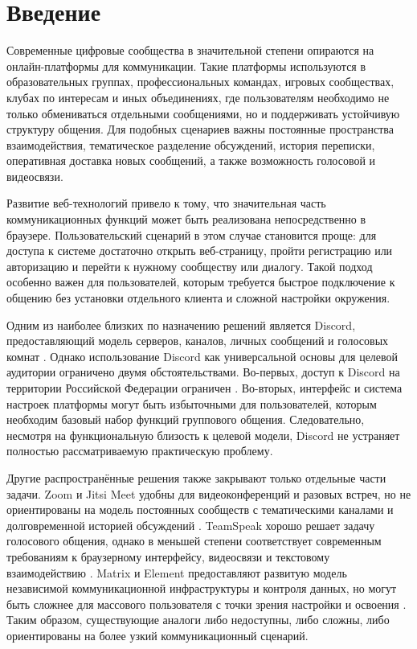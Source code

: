 \documentclass[a4paper,12pt]{extarticle}
\begin{document}
\section{Введение}

Современные цифровые сообщества в значительной степени опираются на онлайн-платформы для коммуникации. Такие платформы используются в образовательных группах, профессиональных командах, игровых сообществах, клубах по интересам и иных объединениях, где пользователям необходимо не только обмениваться отдельными сообщениями, но и поддерживать устойчивую структуру общения. Для подобных сценариев важны постоянные пространства взаимодействия, тематическое разделение обсуждений, история переписки, оперативная доставка новых сообщений, а также возможность голосовой и видеосвязи.

Развитие веб-технологий привело к тому, что значительная часть коммуникационных функций может быть реализована непосредственно в браузере. Пользовательский сценарий в этом случае становится проще: для доступа к системе достаточно открыть веб-страницу, пройти регистрацию или авторизацию и перейти к нужному сообществу или диалогу. Такой подход особенно важен для пользователей, которым требуется быстрое подключение к общению без установки отдельного клиента и сложной настройки окружения.

Одним из наиболее близких по назначению решений является Discord, предоставляющий модель серверов, каналов, личных сообщений и голосовых комнат \cite{discord}. Однако использование Discord как универсальной основы для целевой аудитории ограничено двумя обстоятельствами. Во-первых, доступ к Discord на территории Российской Федерации ограничен \cite{discord_russia}. Во-вторых, интерфейс и система настроек платформы могут быть избыточными для пользователей, которым необходим базовый набор функций группового общения. Следовательно, несмотря на функциональную близость к целевой модели, Discord не устраняет полностью рассматриваемую практическую проблему.

Другие распространённые решения также закрывают только отдельные части задачи. Zoom и Jitsi Meet удобны для видеоконференций и разовых встреч, но не ориентированы на модель постоянных сообществ с тематическими каналами и долговременной историей обсуждений \cite{zoom, jitsi}. TeamSpeak хорошо решает задачу голосового общения, однако в меньшей степени соответствует современным требованиям к браузерному интерфейсу, видеосвязи и текстовому взаимодействию \cite{teamspeak}. Matrix и Element предоставляют развитую модель независимой коммуникационной инфраструктуры и контроля данных, но могут быть сложнее для массового пользователя с точки зрения настройки и освоения \cite{matrix, element}. Таким образом, существующие аналоги либо недоступны, либо сложны, либо ориентированы на более узкий коммуникационный сценарий.
\end{document}
